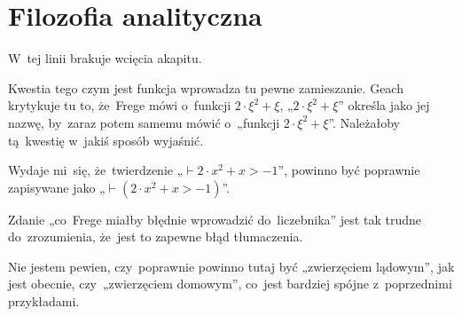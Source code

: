 \documentclass[a4paper,11pt]{article}
\begin{document}
\newpage
\section{Filozofia analityczna}

\vspace{\spaceTwo}






\start {} W~tej linii brakuje wcięcia akapitu.

\vspace{\spaceFour}


\start {} Kwestia tego czym jest funkcja wprowadza tu
pewne zamieszanie. Geach krytykuje tu to, że~Frege mówi o~funkcji
$2 \cdot \xi^{ 2 } + \xi$, „$2 \cdot \xi^{ 2 } + \xi$” określa jako
jej nazwę, by~zaraz potem samemu mówić o~„funkcji
$2 \cdot \xi^{ 2 } + \xi$”. Należałoby tą~kwestię w~jakiś sposób
wyjaśnić.

\vspace{\spaceFour}


\start {} Wydaje mi~się, że~twierdzenie
„$\vdash 2 \cdot x^{ 2 } + x > -1$”, powinno być poprawnie
zapisywane jako „$\vdash( 2 \cdot x^{ 2 } + x > -1)$”.

\vspace{\spaceFour}


\start {} Zdanie „co~Frege miałby błędnie wprowadzić
do~liczebnika” jest tak trudne do~zrozumienia, że~jest to zapewne
błąd tłumaczenia.

\vspace{\spaceFour}


\start {} Nie jestem pewien, czy~poprawnie powinno tutaj
być „zwierzęciem lądowym”, jak jest obecnie, czy~„zwierzęciem
domowym”, co~jest bardziej spójne z~poprzednimi przykładami.

\vspace{\spaceFour}





\end{document}
